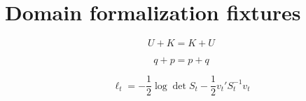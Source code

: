 \section{Domain formalization fixtures}

\begin{equation}\label{eq:domain-hamiltonian-commute}
U + K = K + U
\end{equation}

\begin{equation}\label{eq:domain-hamiltonian-missing-assumption}
q + p = p + q
\end{equation}

\begin{equation}\label{eq:domain-kalman-unsupported}
\ell_t = -\frac{1}{2}\log\det S_t - \frac{1}{2}v_t' S_t^{-1}v_t
\end{equation}
